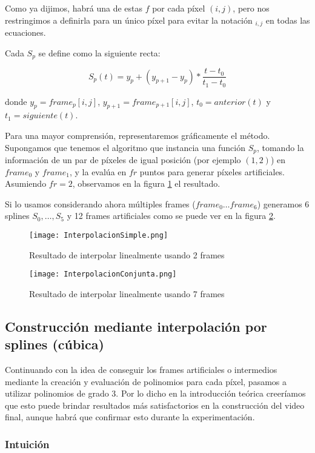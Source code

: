 Como ya dijimos, habrá una de estas $f$ por cada píxel $(i,j)$, pero nos restringimos a definirla para un único píxel para evitar la notación $_{i,j}$ en todas las ecuaciones.

Cada $S_p$ se define como la siguiente recta:

$$S_p(t) = y_p + (y_{p+1} - y_p) * \frac{t - t_0}{t_1 - t_0}$$

donde $y_{p} = frame_p[i,j]$, $y_{p+1} = frame_{p+1}[i,j]$, $t_0=anterior(t)$ y $t_1=siguiente(t)$.

Para una mayor comprensi\'on, representaremos gr\'aficamente el método. Supongamos que tenemos el algoritmo que instancia una funci\'on $S_{p}$, tomando la información de un par de p\'ixeles de igual posici\'on (por ejemplo $(1,2)$) en $frame_0$ y $frame_1$, y la evalúa en $fr$ puntos para generar píxeles artificiales. Asumiendo $fr = 2$, observamos en la figura \ref{fig:intSimple} el resultado.

Si lo usamos considerando ahora múltiples frames ($frame_0 \ldots frame_6$) generamos 6 splines $S_0, \ldots, S_5$ y 12 frames artificiales como se puede ver en la figura \ref{fig:intConjunta}.

\begin{figure}[h!]
  \centering
    \texttt{[image: InterpolacionSimple.png]}
     \caption{Resultado de interpolar linealmente usando 2 frames}\label{fig:intSimple}
\end{figure}
\noindent

\begin{figure}[h!]
  \centering
    \texttt{[image: InterpolacionConjunta.png]}
     \caption{Resultado de interpolar linealmente usando 7 frames}\label{fig:intConjunta}
\end{figure}
\noindent

\subsection{Construcción mediante interpolación por splines (c\'ubica)}

Continuando con la idea de conseguir los frames artificiales o intermedios mediante la creación y evaluación de polinomios para cada píxel, pasamos a utilizar polinomios de grado 3. Por lo dicho en la introducción teórica creeríamos que esto puede brindar resultados m\'as satisfactorios en la construcci\'on del video final, aunque habr\'a que confirmar esto durante la experimentaci\'on.

\subsubsection*{\bf{Intuición}}


